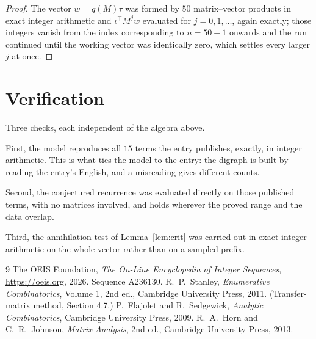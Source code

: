\documentclass[11pt,a4paper]{article}
\theoremstyle{plain}
\theoremstyle{definition}
\begin{document}
\begin{proof}
The vector $w=q(M)\tau$ was formed by $50$ matrix--vector products in exact integer
arithmetic and $\iota^{\!\top}M^{j}w$ evaluated for $j=0,1,\dots$, again exactly; those
integers vanish from the index corresponding to $n=50+1$ onwards and the run continued
until the working vector was identically zero, which settles every larger $j$ at once.
\end{proof}

\section{Verification}

Three checks, each independent of the algebra above.

First, the model reproduces all $15$ terms the entry publishes, exactly, in integer
arithmetic. This is what ties the model to the entry: the digraph is built by reading the
entry's English, and a misreading gives different counts.

Second, the conjectured recurrence was evaluated directly on those published terms, with no
matrices involved, and holds wherever the proved range and the data overlap.

Third, the annihilation test of Lemma~\ref{lem:crit} was carried out in exact integer
arithmetic on the whole vector rather than on a sampled prefix.

\begin{thebibliography}{9}
 The OEIS Foundation, \emph{The On-Line Encyclopedia of Integer
Sequences}, \url{https://oeis.org}, 2026. Sequence A236130.
 R.~P.~Stanley, \emph{Enumerative Combinatorics}, Volume 1, 2nd ed.,
Cambridge University Press, 2011. (Transfer-matrix method, Section 4.7.)
 P.~Flajolet and R.~Sedgewick, \emph{Analytic Combinatorics}, Cambridge
University Press, 2009.
 R.~A.~Horn and C.~R.~Johnson, \emph{Matrix Analysis}, 2nd ed., Cambridge
University Press, 2013.
\end{thebibliography}
\end{document}
